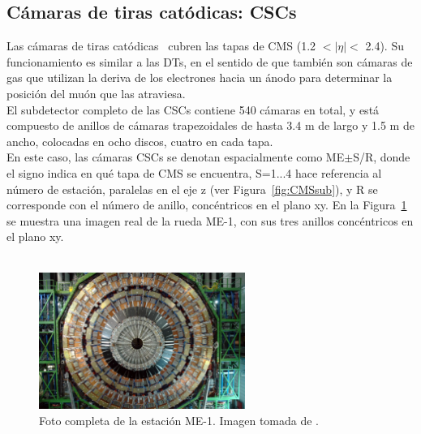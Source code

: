 \subsection{C\'amaras de tiras cat\'odicas: CSCs}\label{sec:CSCs}

Las c\'amaras de tiras cat\'odicas~\cite{CSCperformance} cubren las tapas de CMS (1.2 $< \lvert \eta \rvert <$ 2.4). Su funcionamiento es similar a las DTs, en el sentido de que tambi\'en son c\'amaras de gas que utilizan la deriva de los electrones hacia un \'anodo para determinar la posici\'on del mu\'on que las atraviesa. \\

El subdetector completo de las CSCs contiene 540 c\'amaras en total, y est\'a compuesto de anillos de c\'amaras trapezoidales de hasta 3.4 m de largo y 1.5 m de ancho, colocadas en ocho discos, cuatro en cada tapa. \\
En este caso, las c\'amaras CSCs se denotan espacialmente como ME$\pm$S/R, donde el signo indica en qu\'e tapa de CMS se encuentra, S=1...4 hace referencia al n\'umero de estaci\'on, paralelas en el eje z (ver Figura~\ref{fig:CMSsub}), y R se corresponde con el n\'umero de anillo, conc\'entricos en el plano xy. En la Figura~\ref{fig:CSC_MEm1} se muestra una imagen real de la rueda ME-1, con sus tres anillos conc\'entricos en el plano xy. \\ \\ 

\begin{figure}[h]
\centering
\includegraphics[width=0.60\textwidth]{figures/CSC_MEm1.jpg}
\caption{Foto completa de la estaci\'on ME-1. Imagen tomada de \cite{Breedon:1431505}.}
\label{fig:CSC_MEm1}        
\end{figure}


